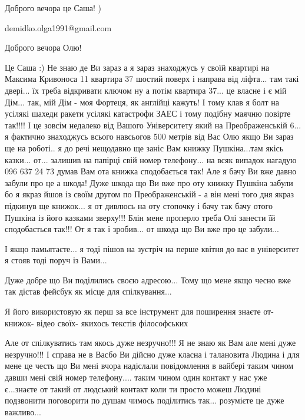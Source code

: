  
 
 
 
 

Доброго вечора це Саша! )

demidko.olga1991@gmail.com

Доброго вечора Олю!

Це Саша :) Не знаю де Ви зараз а я зараз знаходжусь у своїй квартирі на Максима
Кривоноса 11 квартира 37 шостий поверх і направа від ліфта... там такі двері...
їх треба відкривати ключом ну а потім квартира 37...  це власне і є мій Дім...
так, мій Дім - моя Фортеця, як англійці кажуть! І тому клав я болт на усілякі
шахеди ракети усілякі катастрофи ЗАЕС і тому подібну маячню повірте так!!!!  І
це зовсім недалеко від Вашого Університету який на Преображенській 6... я
фактично знаходжусь всього навсьогов 500 метрів від Вас Олю якщо Ви зараз ще на
роботі.. я до речі нещодавно ще заніс Вам книжку Пушкіна...там якісь казки...
от... залишив на папірці свій номер телефону... на всяк випадок нагадую 096 637
24 73 думав Вам ота книжка сподобається так! Але я бачу Ви вже давно забули про
це а шкода!  Дуже шкода що Ви вже про оту книжку Пушкіна забули бо я якраз йшов
із своїм другом по Преображенській - а він мені того дня якраз підкинув ще
книжок... я от дивлюсь на оту стопочку і бачу так бачу отого Пушкіна із його
казками зверху!!! Блін мене проперло треба Олі занести їй сподобається так!!!
От я так і зробив... от шкода що Ви вже про це забули...

І якщо памьятаєте... я тоді пішов на зустріч на перше квітня до вас в університет
я стояв тоді поруч із Вами...

Дуже добре що Ви поділились своєю адресою... Тому що мене якщо чесно вже так
дістав фейсбук як місце для спілкування... 

Я його використовую як перш за все інструмент для поширення знаєте от- книжок-
відео своїх- якихось текстів філософських

Але от спілкуватись там якось дуже незручно!!! Я не знаю як Вам але мені дуже
незручно!!! І справа не в Васбо Ви дійсно дуже класна і талановита Людина і для
мене це честь що Ви мені вчора надіслали повідомлення в вайбері таким чином
давши мені свій номер телефону.... таким чином один контакт у нас уже
є...знаєте от такий от людський контакт коли ти просто можеш Людині подзвонити
поговорити по душам чимось поділитись так...  розумієте це дуже важливо...

